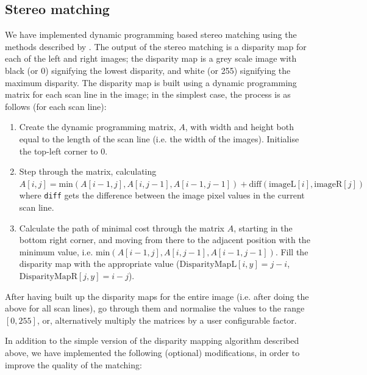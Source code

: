 
\subsection{Stereo matching}
\label{sec:stereo}
We have implemented dynamic programming based stereo matching using the methods
described by \citet{realtimestereo}. The output of the stereo matching is a
disparity map for each of the left and right images; the disparity map is a grey
scale image with black (or 0) signifying the lowest disparity, and white (or
255) signifying the maximum disparity. The disparity map is built using a
dynamic programming matrix for each scan line in the image; in the simplest
case, the process is as follows (for each scan line):

\begin{enumerate}
\item Create the dynamic programming matrix, $A$, with width and height both
  equal to the length of the scan line (i.e. the width of the images).
  Initialise the top-left corner to 0.

\item Step through the matrix, calculating $A[i,j] = \mathrm{min}(A[i-1,j],
  A[i,j-1], A[i-1,j-1]) + \mathrm{diff}(\mathrm{imageL}[i], \mathrm{imageR}[j])$
  where \texttt{diff} gets the difference between the image pixel values in the
  current scan line.

\item Calculate the path of minimal cost through the matrix $A$, starting in the
  bottom right corner, and moving from there to the adjacent position with the
  minimum value, i.e. $\mathrm{min}(A[i-1,j], A[i,j-1], A[i-1,j-1])$. Fill the
  disparity map with the appropriate value ($\mathrm{DisparityMapL}[i,y]=j-i$,
  $\mathrm{DisparityMapR}[j,y]=i-j$).
\end{enumerate}

After having built up the disparity maps for the entire image (i.e. after doing
the above for all scan lines), go through them and normalise the values to the
range $[0,255]$, or, alternatively multiply the matrices by a user configurable
factor.

In addition to the simple version of the disparity mapping algorithm described
above, we have implemented the following (optional) modifications, in order to
improve the quality of the matching:

